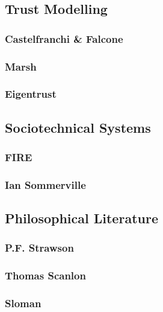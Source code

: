 \subsection{Trust Modelling}

\subsubsection{Castelfranchi \& Falcone}

\subsubsection{Marsh}

\subsubsection{Eigentrust}


\subsection{Sociotechnical Systems}

\subsubsection{FIRE}

\subsubsection{Ian Sommerville}


\subsection{Philosophical Literature}  %

\subsubsection{P.F. Strawson}  %

\subsubsection{Thomas Scanlon}  %

\subsubsection{Sloman}  %



